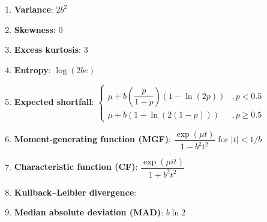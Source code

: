 \begin{enumerate}
    \item \textbf{Variance}: $ {\displaystyle 2b^{2}}$
    \hfill \cite{wiki/Laplace_distribution}

    \item \textbf{Skewness}: $ {\displaystyle 0}$
    \hfill \cite{wiki/Laplace_distribution}

    \item \textbf{Excess kurtosis}: $  {\displaystyle 3} $
    \hfill \cite{wiki/Laplace_distribution}

    \item \textbf{Entropy}: $  {\displaystyle \log(2be)} $
    \hfill \cite{wiki/Laplace_distribution}


    \item \textbf{Expected shortfall}:
    $ {\displaystyle {\begin{cases}\mu +b\left({\dfrac {p}{1-p}}\right)(1-\ln(2p))&,p<0.5\\\mu +b\left(1-\ln \left(2(1-p)\right)\right)&,p\geq 0.5\end{cases}}}$
    \hfill \cite{wiki/Laplace_distribution}

    \item \textbf{Moment-generating function (MGF)}:
    $ {\displaystyle {\dfrac {\exp(\mu t)}{1-b^{2}t^{2}}}{\text{ for }}|t|<1/b}$
    \hfill \cite{wiki/Laplace_distribution}

    \item \textbf{Characteristic function (CF)}:
    $ {\displaystyle {\dfrac {\exp(\mu it)}{1+b^{2}t^{2}}}}$
    \hfill \cite{wiki/Laplace_distribution}

    \item \textbf{Kullback–Leibler divergence}:
    $ $
    \hfill \cite{wiki/Laplace_distribution}

    \item \textbf{Median absolute deviation (MAD)}:
    $ {\displaystyle b\ln 2}$
    \hfill \cite{wiki/Laplace_distribution}
\end{enumerate}











